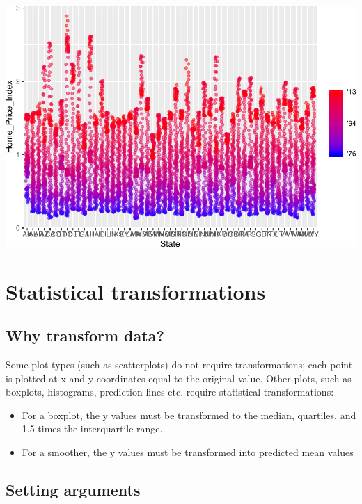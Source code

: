 \documentclass[
]{book}
\providecommand{\tightlist}{%
  \setlength{\itemsep}{0pt}\setlength{\parskip}{0pt}}
\begin{document}
\begin{alert}
\includegraphics{R/Rgraphics/figures/unnamed-chunk-175-1.pdf}

\end{alert}

\hypertarget{statistical-transformations}{%
\section{Statistical transformations}\label{statistical-transformations}}

\hypertarget{why-transform-data}{%
\subsection{Why transform data?}\label{why-transform-data}}

Some plot types (such as scatterplots) do not require transformations; each point is plotted at x and y coordinates equal to the original value. Other plots, such as boxplots, histograms, prediction lines etc. require statistical transformations:

\begin{itemize}
\tightlist
\item
  For a boxplot, the y values must be transformed to the median, quartiles, and 1.5 times the interquartile range.
\item
  For a smoother, the y values must be transformed into predicted mean values
\end{itemize}

\hypertarget{setting-arguments}{%
\subsection{Setting arguments}\label{setting-arguments}}
\end{document}

